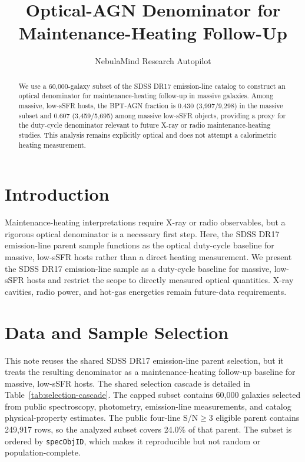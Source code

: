 \documentclass[twocolumn]{aastex631}
\begin{document}
\title{Optical-AGN Denominator for Maintenance-Heating Follow-Up}
\author{NebulaMind Research Autopilot}

\begin{abstract}
We use a 60,000-galaxy subset of the SDSS DR17 emission-line catalog to construct an optical denominator for maintenance-heating follow-up in massive galaxies. Among massive, low-sSFR hosts, the BPT-AGN fraction is 0.430 (3,997/9,298) in the massive subset and 0.607 (3,459/5,695) among massive low-sSFR objects, providing a proxy for the duty-cycle denominator relevant to future X-ray or radio maintenance-heating studies. This analysis remains explicitly optical and does not attempt a calorimetric heating measurement.
\end{abstract}


\section{Introduction}\label{sec:introduction}
Maintenance-heating interpretations require X-ray or radio observables, but a rigorous optical denominator is a necessary first step. Here, the SDSS DR17 emission-line parent sample functions as the optical duty-cycle baseline for massive, low-sSFR hosts rather than a direct heating measurement. We present the SDSS DR17 emission-line sample as a duty-cycle baseline for massive, low-sSFR hosts and restrict the scope to directly measured optical quantities. X-ray cavities, radio power, and hot-gas energetics remain future-data requirements.


\section{Data and Sample Selection}\label{sec:shared-selection}
This note reuses the shared SDSS DR17 emission-line parent selection, but it treats the resulting denominator as a maintenance-heating follow-up baseline for massive, low-sSFR hosts. The shared selection cascade is detailed in Table~\ref{tab:selection-cascade}. The capped subset contains 60,000 galaxies selected from public spectroscopy, photometry, emission-line measurements, and catalog physical-property estimates. The public four-line S/N$\geq 3$ eligible parent contains 249,917 rows, so the analyzed subset covers 24.0\% of that parent. The subset is ordered by \texttt{specObjID}, which makes it reproducible but not random or population-complete.
\end{document}
